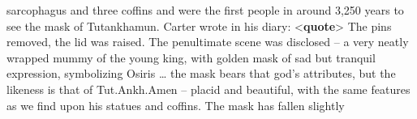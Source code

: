 \begin{shaded}
\hspace*{1em}\hspace*{1em}\hspace*{1em}\hspace*{1em}\hspace*{1em}\hspace*{1em}\hspace*{1em}\hspace*{1em} sarcophagus and three coffins and were the first people in around 3,250 years to see the mask of Tutankhamun.\mbox{}\newline 
\hspace*{1em}\hspace*{1em}\hspace*{1em}\hspace*{1em}\hspace*{1em}\hspace*{1em}\hspace*{1em}\hspace*{1em} Carter wrote in his diary: {<\textbf{quote}>} The pins removed, the lid was raised. The penultimate scene was disclosed –\mbox{}\newline 
\hspace*{1em}\hspace*{1em}\hspace*{1em}\hspace*{1em}\hspace*{1em}\hspace*{1em}\hspace*{1em}\hspace*{1em}\hspace*{1em}\hspace*{1em} a very neatly wrapped mummy of the young king, with golden mask of sad but tranquil expression, symbolizing\mbox{}\newline 
\hspace*{1em}\hspace*{1em}\hspace*{1em}\hspace*{1em}\hspace*{1em}\hspace*{1em}\hspace*{1em}\hspace*{1em}\hspace*{1em}\hspace*{1em} Osiris … the mask bears that god's attributes, but the likeness is that of Tut.Ankh.Amen – placid and\mbox{}\newline 
\hspace*{1em}\hspace*{1em}\hspace*{1em}\hspace*{1em}\hspace*{1em}\hspace*{1em}\hspace*{1em}\hspace*{1em}\hspace*{1em}\hspace*{1em} beautiful, with the same features as we find upon his statues and coffins. The mask has fallen slightly\mbox{}\newline 

\end{shaded}
